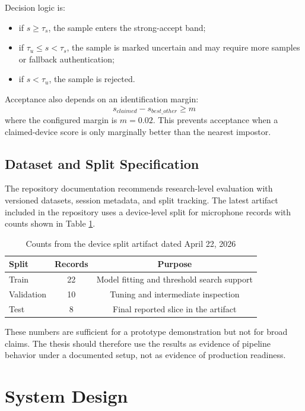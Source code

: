 \documentclass[12pt]{report}
\begin{document}
Decision logic is:
\begin{itemize}[leftmargin=1.2cm]
\item if $s \geq \tau_s$, the sample enters the strong-accept band;
\item if $\tau_u \leq s < \tau_s$, the sample is marked uncertain and may require more samples or fallback authentication;
\item if $s < \tau_u$, the sample is rejected.
\end{itemize}

Acceptance also depends on an identification margin:
\begin{equation}
s_{claimed} - s_{best\_other} \geq m
\end{equation}
where the configured margin is $m = 0.02$. This prevents acceptance when a claimed-device score is only marginally better than the nearest impostor.

\section{Dataset and Split Specification}
The repository documentation recommends research-level evaluation with versioned datasets, session metadata, and split tracking. The latest artifact included in the repository uses a device-level split for microphone records with counts shown in Table \ref{tab:splitcounts}.

\begin{table}[H]
\centering
\caption{Counts from the device split artifact dated April 22, 2026}
\label{tab:splitcounts}
\renewcommand{\arraystretch}{1.3}
\begin{tabular}{lcc}
\toprule
\textbf{Split} & \textbf{Records} & \textbf{Purpose} \\
\midrule
Train & 22 & Model fitting and threshold search support \\
Validation & 10 & Tuning and intermediate inspection \\
Test & 8 & Final reported slice in the artifact \\
\bottomrule
\end{tabular}
\end{table}

These numbers are sufficient for a prototype demonstration but not for broad claims. The thesis should therefore use the results as evidence of pipeline behavior under a documented setup, not as evidence of production readiness.

\chapter{System Design}
\end{document}
